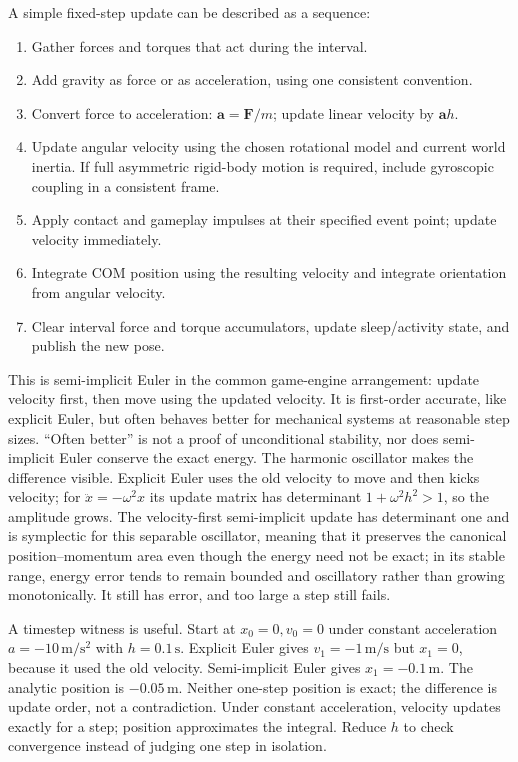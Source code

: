 A simple fixed-step update can be described as a sequence:

\begin{enumerate}
\def\labelenumi{\arabic{enumi}.}
\tightlist
\item
  Gather forces and torques that act during the interval.
\item
  Add gravity as force or as acceleration, using one consistent convention.
\item
  Convert force to acceleration: \(\mathbf a=\mathbf F/m\); update linear velocity by \(\mathbf a h\).
\item
  Update angular velocity using the chosen rotational model and current world inertia. If full asymmetric rigid-body motion is required, include gyroscopic coupling in a consistent frame.
\item
  Apply contact and gameplay impulses at their specified event point; update velocity immediately.
\item
  Integrate COM position using the resulting velocity and integrate orientation from angular velocity.
\item
  Clear interval force and torque accumulators, update sleep/activity state, and publish the new pose.
\end{enumerate}

This is semi-implicit Euler in the common game-engine arrangement: update velocity first, then move using the updated velocity. It is first-order accurate, like explicit Euler, but often behaves better for mechanical systems at reasonable step sizes. ``Often better'' is not a proof of unconditional stability, nor does semi-implicit Euler conserve the exact energy. The harmonic oscillator makes the difference visible. Explicit Euler uses the old velocity to move and then kicks velocity; for \(\ddot x=-\omega^2x\) its update matrix has determinant \(1+\omega^2h^2>1\), so the amplitude grows. The velocity-first semi-implicit update has determinant one and is symplectic for this separable oscillator, meaning that it preserves the canonical position--momentum area even though the energy need not be exact; in its stable range, energy error tends to remain bounded and oscillatory rather than growing monotonically. It still has error, and too large a step still fails.

A timestep witness is useful. Start at \(x_0=0,v_0=0\) under constant acceleration \(a=-10\,\mathrm{m/s^2}\) with \(h=0.1\,\mathrm s\). Explicit Euler gives \(v_1=-1\,\mathrm{m/s}\) but \(x_1=0\), because it used the old velocity. Semi-implicit Euler gives \(x_1=-0.1\,\mathrm m\). The analytic position is \(-0.05\,\mathrm m\). Neither one-step position is exact; the difference is update order, not a contradiction. Under constant acceleration, velocity updates exactly for a step; position approximates the integral. Reduce \(h\) to check convergence instead of judging one step in isolation.

